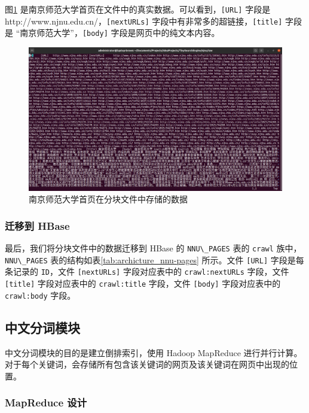 \documentclass{ctexart}
\newcommand{\code}[1]{\colorbox{backcolor}{\lstinline|#1|}}
\begin{document}
    图\ref{fig:crawl_row} 是南京师范大学首页在文件中的真实数据。可以看到，\code{[URL]} 字段是 http://www.njnu.edu.cn/，\code{[nextURLs]} 字段中有非常多的超链接，\code{[title]} 字段是 “南京师范大学”，\code{[body]} 字段是网页中的纯文本内容。

    \begin{figure}[t]
        \centering
        \includegraphics[width=\textwidth]{src/crawl_row}
        \caption{南京师范大学首页在分块文件中存储的数据}
        \label{fig:crawl_row}
    \end{figure}

    \subsubsection{迁移到 HBase}\label{subsubsec:crawl_migrate}

    最后，我们将分块文件中的数据迁移到 HBase 的 \code{NNU\_PAGES} 表的 \code{crawl} 族中，\code{NNU\_PAGES} 表的结构如表\ref{tab:archicture_nnu-pages} 所示。文件 \code{[URL]} 字段是每条记录的 \code{ID}，文件 \code{[nextURLs]} 字段对应表中的 \code{crawl:nextURLs} 字段，文件 \code{[title]} 字段对应表中的 \code{crawl:title} 字段，文件 \code{[body]} 字段对应表中的 \code{crawl:body} 字段。

    \subsection{中文分词模块}\label{subsec:segment}

    中文分词模块的目的是建立倒排索引，使用 Hadoop MapReduce 进行并行计算。对于每个关键词，会存储所有包含该关键词的网页及该关键词在网页中出现的位置。

    \subsubsection{MapReduce 设计}\label{subsubsec:segment_mapreduce}
\end{document}
